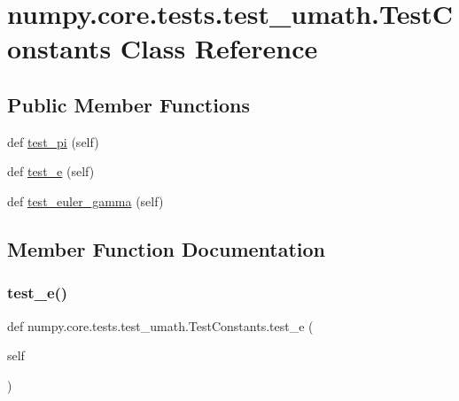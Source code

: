 \hypertarget{classnumpy_1_1core_1_1tests_1_1test__umath_1_1TestConstants}{}\section{numpy.\+core.\+tests.\+test\+\_\+umath.\+Test\+Constants Class Reference}
\label{classnumpy_1_1core_1_1tests_1_1test__umath_1_1TestConstants}
\subsection*{Public Member Functions}
\begin{DoxyCompactItemize}
\item 
def \hyperlink{classnumpy_1_1core_1_1tests_1_1test__umath_1_1TestConstants_a704449f167c3ac2e44969a8928a1bc45}{test\+\_\+pi} (self)
\item 
def \hyperlink{classnumpy_1_1core_1_1tests_1_1test__umath_1_1TestConstants_aa3d2cca407849ecd43fe00b9fdf47b5f}{test\+\_\+e} (self)
\item 
def \hyperlink{classnumpy_1_1core_1_1tests_1_1test__umath_1_1TestConstants_a880bd0d1afc14d69a219b327efbd1e48}{test\+\_\+euler\+\_\+gamma} (self)
\end{DoxyCompactItemize}


\subsection{Member Function Documentation}
\mbox{\label{classnumpy_1_1core_1_1tests_1_1test__umath_1_1TestConstants_aa3d2cca407849ecd43fe00b9fdf47b5f}} 
\subsubsection{\texorpdfstring{test\+\_\+e()}{test\_e()}}
{\footnotesize\ttfamily def numpy.\+core.\+tests.\+test\+\_\+umath.\+Test\+Constants.\+test\+\_\+e (\begin{DoxyParamCaption}\item[{}]{self }\end{DoxyParamCaption})}

